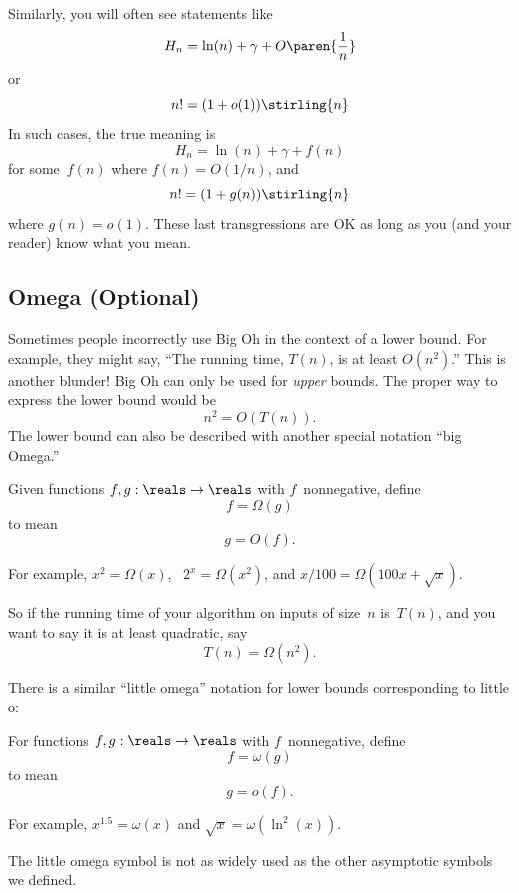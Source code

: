 Similarly, you will often see statements like
\[
    H_n = \ln(n) + \gamma + O\paren{\frac{1}{n}}
\]
or
\[
    n! = (1 + o(1)) \stirling{n}
\]
In such cases, the true meaning is
\[
    H_n = \ln(n) + \gamma + f(n)
\]
for some~$f(n)$ where $f(n) = O(1/n)$, and
\[
    n! = (1 + g(n)) \stirling{n}
\]
where $g(n) = o(1)$.  These last transgressions are OK as long as you
(and your reader) know what you mean.

\subsection{Omega (Optional)}\label{omega_subsec}

Sometimes people incorrectly use Big Oh in the context of a lower
bound.  For example, they might say, ``The running time, $T(n)$, is at
least $O(n^2)$.''  This is another blunder!  Big Oh can only be used
for \emph{upper} bounds.  The proper way to express the lower bound
would be
\[
n^2 = O(T(n)).
\]
The lower bound can also be described with another special notation
``big Omega.''
\begin{definition}\label{def:Omega}
Given functions $f, g : \reals \to \reals$ with $f$~nonnegative,
define
\[
    f = \Omega(g)
\]
to mean
\[
g = O(f).
\]
\end{definition}
For example, $x^2 = \Omega(x)$, \ $2^x = \Omega(x^2)$, and $x/100 =
\Omega(100 x + \sqrt{x})$.

So if the running time of your algorithm on inputs of size~$n$
is~$T(n)$, and you want to say it is at least quadratic, say
\[
    T(n) = \Omega(n^2).
\]

There is a similar ``little  omega'' notation for lower bounds corresponding to
little o:

\begin{definition}\label{def:omega}
For functions $f, g: \reals \to \reals$ with $f$~nonnegative, define
\[
    f = \omega(g)
\]
to mean
\[
g = o(f).
\]
\end{definition}

For example, $x^{1.5} = \omega(x)$ and $\sqrt{x} = \omega(\ln^2(x))$.

The little omega symbol is not as widely used as the other asymptotic
symbols we defined.

